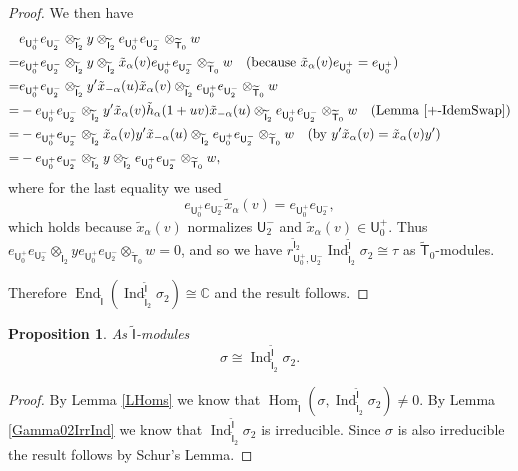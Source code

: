 \documentclass[10pt, letterpaper]{amsart}
\theoremstyle{plain}
\newtheorem{Prop}[equation]{Proposition}
\theoremstyle{definition}
\numberwithin{equation}{section}
\newcommand{\xt}{\tilde{x}}
\newcommand{\htt}{\tilde{h}}
\newcommand{\Ind}{\operatorname{Ind}}
\newcommand{\End}{\operatorname{End}}
\newcommand{\Hom}{\operatorname{Hom}}
\newcommand{\If}{\mathsf{I}}
\newcommand{\Tf}{\mathsf{T}}
\newcommand{\Uf}{\mathsf{U}}
\begin{document}
\begin{proof}
We then have
\begin{align*}
	&e_{{\Uf}^{+}_{0}}e_{{\Uf}^{-}_{2}}\otimes_{\widetilde{{\If}}_{2}}y\otimes_{\widetilde{{\If}}_{2}}e_{{\Uf}^{+}_{0}}e_{{\Uf}^{-}_{2}}\otimes_{\widetilde{{\Tf}}_{0}} w\\
    =&e_{{\Uf}^{+}_{0}}e_{{\Uf}^{-}_{2}}\otimes_{\widetilde{{\If}}_{2}}y\otimes_{\widetilde{{\If}}_{2}}\xt_{\alpha}(v)e_{{\Uf}^{+}_{0}}e_{{\Uf}^{-}_{2}}\otimes_{\widetilde{{\Tf}}_{0}} w\quad(\text{because $\xt_{\alpha}(v)e_{{\Uf}^{+}_{0}}=e_{{\Uf}^{+}_{0}}$})\\
	=&e_{{\Uf}^{+}_{0}}e_{{\Uf}^{-}_{2}}\otimes_{\widetilde{{\If}}_{2}}y^{\prime}\xt_{-\alpha}( u)\xt_{\alpha}(v)\otimes_{\widetilde{{\If}}_{2}}e_{{\Uf}^{+}_{0}}e_{{\Uf}^{-}_{2}}\otimes_{\widetilde{{\Tf}}_{0}} w\\
	=&-e_{{\Uf}^{+}_{0}}e_{{\Uf}^{-}_{2}}\otimes_{\widetilde{{\If}}_{2}}y^{\prime}\xt_{\alpha}(v)\htt_{\alpha}(1+uv)\xt_{-\alpha}(u)\otimes_{\widetilde{{\If}}_{2}}e_{{\Uf}^{+}_{0}}e_{{\Uf}^{-}_{2}}\otimes_{\widetilde{{\Tf}}_{0}} w\quad (\text{Lemma \ref{+-IdemSwap}})\\
	=&-e_{{\Uf}^{+}_{0}}e_{{\Uf}^{-}_{2}}\otimes_{\widetilde{{\If}}_{2}}\xt_{\alpha}(v)y^{\prime}\xt_{-\alpha}(u)\otimes_{\widetilde{{\If}}_{2}}e_{{\Uf}^{+}_{0}}e_{{\Uf}^{-}_{2}}\otimes_{\widetilde{{\Tf}}_{0}} w\quad (\text{by $y^{\prime}\xt_{\alpha}(v)=\xt_{\alpha}(v)y^{\prime}$})\\
	=&-e_{{\Uf}^{+}_{0}}e_{{\Uf}^{-}_{2}}\otimes_{\widetilde{{\If}}_{2}}y\otimes_{\widetilde{{\If}}_{2}}e_{{\Uf}^{+}_{0}}e_{{\Uf}^{-}_{2}}\otimes_{\widetilde{{\Tf}}_{0}} w,
\end{align*}
where for the last equality we used
\[
e_{{\Uf}^{+}_{0}}e_{{\Uf}^{-}_{2}}\xt_{\alpha}(v)=e_{{\Uf}^{+}_{0}}e_{{\Uf}^{-}_{2}},
\]
which holds because $\xt_{\alpha}(v)$ normalizes $\Uf_2^-$ and $\xt_{\alpha}(v)\in\Uf_0^+$. Thus $e_{{\Uf}^{+}_{0}}e_{{\Uf}^{-}_{2}}\otimes_{\widetilde{{\If}}_{2}}ye_{{\Uf}^{+}_{0}}e_{{\Uf}^{-}_{2}}\otimes_{\widetilde{{\Tf}}_{0}} w=0$, and so we have $r_{{\Uf}^{+}_{0},{\Uf}^{-}_{2}}^{\widetilde{{\If}}_{2}}\Ind_{\widetilde{{\If}}_{2}}^{\widetilde{{\If}}}\sigma_{2}\cong \tau$ as $\widetilde{{\Tf}}_{0}$-modules.

Therefore $\End_{\widetilde{{\If}}}(\Ind_{\widetilde{{\If}}_{2}}^{\widetilde{{\If}}}\sigma_{2})\cong \mathbb{C}$ and the result follows.
\end{proof}

\begin{Prop}\label{IndSig2}
	As $\widetilde{\If}$-modules
	\begin{equation*}
		\sigma \cong \Ind_{\widetilde{\If}_2}^{\widetilde{\If}}\sigma_{2}.
	\end{equation*}
\end{Prop}
\begin{proof}
	By Lemma \ref{LHoms} we know that $\Hom_{\widetilde{\If}}(\sigma,\Ind_{\widetilde{\If}_2}^{\widetilde{\If}}\sigma_{2})\neq 0$. By Lemma \ref{Gamma02IrrInd} we know that $\Ind_{\widetilde{\If}_{2}}^{\widetilde{\If}}\sigma_{2}$ is irreducible. Since $\sigma$ is also irreducible the result follows by Schur's Lemma.
\end{proof}
\end{document}
